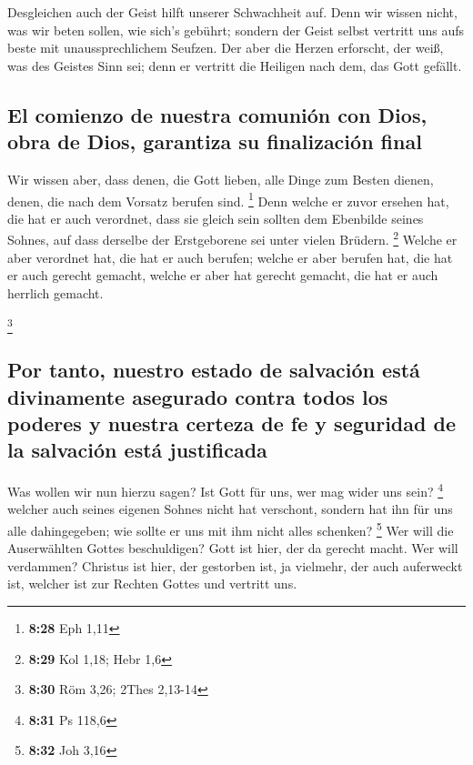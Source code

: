  Desgleichen auch der Geist hilft unserer Schwachheit
auf. Denn wir wissen nicht, was wir beten sollen, wie sich's gebührt;
sondern der Geist selbst vertritt uns aufs beste mit unaussprechlichem
Seufzen.  Der aber die Herzen erforscht, der weiß, was
des Geistes Sinn sei; denn er vertritt die Heiligen nach dem, das Gott
gefällt.

\hypertarget{el-comienzo-de-nuestra-comuniuxf3n-con-dios-obra-de-dios-garantiza-su-finalizaciuxf3n-final}{%
\subsection{El comienzo de nuestra comunión con Dios, obra de Dios,
garantiza su finalización
final}\label{el-comienzo-de-nuestra-comuniuxf3n-con-dios-obra-de-dios-garantiza-su-finalizaciuxf3n-final}}

 Wir wissen aber, dass denen, die Gott lieben, alle Dinge
zum Besten dienen, denen, die nach dem Vorsatz berufen sind. \footnote{\textbf{8:28}
  Eph 1,11}  Denn welche er zuvor ersehen hat, die hat er
auch verordnet, dass sie gleich sein sollten dem Ebenbilde seines
Sohnes, auf dass derselbe der Erstgeborene sei unter vielen Brüdern.
\footnote{\textbf{8:29} Kol 1,18; Hebr 1,6}  Welche er
aber verordnet hat, die hat er auch berufen; welche er aber berufen hat,
die hat er auch gerecht gemacht, welche er aber hat gerecht gemacht, die
hat er auch herrlich gemacht.

\footnote{\textbf{8:30} Röm 3,26; 2Thes 2,13-14}

\hypertarget{por-tanto-nuestro-estado-de-salvaciuxf3n-estuxe1-divinamente-asegurado-contra-todos-los-poderes-y-nuestra-certeza-de-fe-y-seguridad-de-la-salvaciuxf3n-estuxe1-justificada}{%
\subsection{Por tanto, nuestro estado de salvación está divinamente
asegurado contra todos los poderes y nuestra certeza de fe y seguridad
de la salvación está
justificada}\label{por-tanto-nuestro-estado-de-salvaciuxf3n-estuxe1-divinamente-asegurado-contra-todos-los-poderes-y-nuestra-certeza-de-fe-y-seguridad-de-la-salvaciuxf3n-estuxe1-justificada}}

 Was wollen wir nun hierzu sagen? Ist Gott für uns, wer
mag wider uns sein? \footnote{\textbf{8:31} Ps 118,6} 
welcher auch seines eigenen Sohnes nicht hat verschont, sondern hat ihn
für uns alle dahingegeben; wie sollte er uns mit ihm nicht alles
schenken? \footnote{\textbf{8:32} Joh 3,16}  Wer will die
Auserwählten Gottes beschuldigen? Gott ist hier, der da gerecht macht.
 Wer will verdammen? Christus ist hier, der gestorben
ist, ja vielmehr, der auch auferweckt ist, welcher ist zur Rechten
Gottes und vertritt uns.

